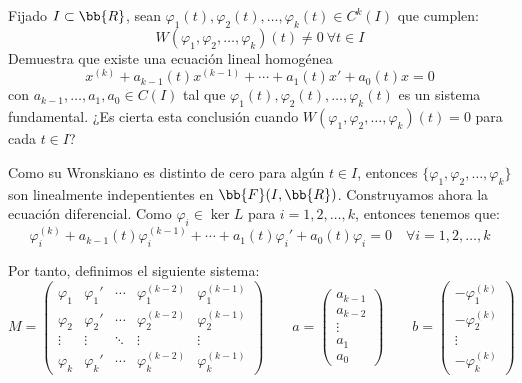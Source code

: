 \begin{ejercicio}\label{ej:4.6}
    Fijado $I\subset \bb{R}$, sean $\varphi_1(t), \varphi_2(t), \ldots, \varphi_k(t)\in C^k(I)$ que cumplen:
    $$W(\varphi_1, \varphi_2, \ldots, \varphi_k)(t) \neq 0~\forall t \in I$$
    Demuestra que existe una ecuación lineal homogénea
    \[
        x^{(k)} + a_{k-1}(t)x^{(k-1)} + \cdots + a_1(t)x' + a_0(t)x = 0
    \]
    con $a_{k-1}, \ldots, a_1, a_0 \in C(I)$ tal que $\varphi_1(t), \varphi_2(t), \ldots, \varphi_k(t)$ es un sistema fundamental. ¿Es cierta esta conclusión cuando $W(\varphi_1, \varphi_2, \ldots, \varphi_k)(t) = 0$ para cada $t \in I$?

    Como su Wronskiano es distinto de cero para algún $t\in I$, entonces $\{\varphi_1,\varphi_2,\ldots,\varphi_k\}$ son linealmente indepentientes en $\bb{F}(I,\bb{R})$. Construyamos ahora la ecuación diferencial. Como $\varphi_i\in \ker L$ para $i=1,2,\ldots,k$, entonces tenemos que:
    \begin{equation*}
        \varphi_i^{(k)} + a_{k-1}(t)\varphi_i^{(k-1)} + \cdots + a_1(t)\varphi_i' + a_0(t)\varphi_i = 0 \quad \forall i=1,2,\ldots,k
    \end{equation*}

    Por tanto, definimos el siguiente sistema:
    \begin{equation*}
        M=\begin{pmatrix}
            \varphi_1 & \varphi_1' & \cdots & \varphi_1^{(k-2)} & \varphi_1^{(k-1)}\\
            \varphi_2 & \varphi_2' & \cdots & \varphi_2^{(k-2)} & \varphi_2^{(k-1)}\\
            \vdots & \vdots & \ddots & \vdots & \vdots\\
            \varphi_k & \varphi_k' & \cdots & \varphi_k^{(k-2)} & \varphi_k^{(k-1)}
        \end{pmatrix}
        \qquad
        a=\begin{pmatrix}
            a_{k-1}\\
            a_{k-2}\\
            \vdots\\
            a_1\\
            a_0
        \end{pmatrix}
        \qquad
        b=\begin{pmatrix}
            -\varphi_1^{(k)}\\
            -\varphi_2^{(k)}\\
            \vdots\\
            -\varphi_k^{(k)}
        \end{pmatrix}
    \end{equation*}
    

\end{ejercicio}
